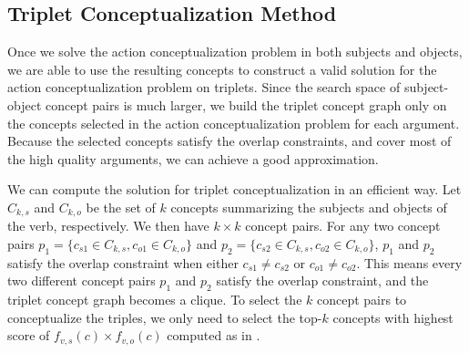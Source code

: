 \subsection{Triplet Conceptualization Method}
Once we solve the action conceptualization problem in both subjects and objects,
we are able to use the resulting concepts to construct a valid solution for
the action conceptualization problem on triplets.
Since the search space of subject-object concept pairs is much larger,
we build the triplet concept graph only on the concepts selected in the
action conceptualization problem for each argument. Because the selected
concepts satisfy the overlap constraints, and cover most of the high quality
arguments, we can achieve a good approximation.

We can compute the solution for triplet conceptualization in an efficient way.
Let $C_{k,s}$ and $C_{k,o}$
be the set of $k$ concepts summarizing the subjects and objects of the verb,
respectively. We then have $k\times k$ concept pairs.
For any two concept pairs $p_1=\{c_{s1}\in C_{k,s}, c_{o1}\in C_{k,o}\}$
and $p_2=\{c_{s2}\in C_{k,s},c_{o2}\in C_{k,o}\}$,
$p_1$ and $p_2$ satisfy
the overlap constraint when either $c_{s1}\neq c_{s2}$ or $c_{o1}\neq c_{o2}$.
This means every two different concept pairs $p_1$ and $p_2$ satisfy the
overlap constraint, and the triplet concept graph becomes a clique.
To select the $k$ concept pairs to conceptualize the triples, we only need
to select the top-$k$ concepts with highest score of
$f_{v,s}(c)\times f_{v,o}(c)$ computed as in .




